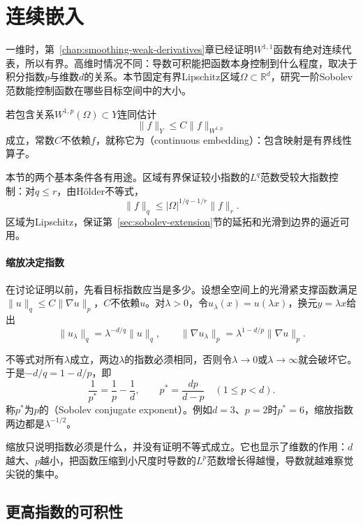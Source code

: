 \section{连续嵌入}
\label{sec:sobolev-continuous-embeddings}

一维时，第~\ref{chap:smoothing-weak-derivatives}章已经证明$W^{1,1}$函数有绝对连续代表，所以有界。高维时情况不同：导数可积能把函数本身控制到什么程度，取决于积分指数$p$与维数$d$的关系。本节固定有界Lipschitz区域$\Omega\subset\mathbb R^d$，研究一阶Sobolev范数能控制函数在哪些目标空间中的大小。

若包含关系$W^{1,p}(\Omega)\subset Y$连同估计
\begin{equation}
\lVert f\rVert_Y\leq C\lVert f\rVert_{W^{1,p}}
\label{eq:sobolev-continuous-embedding}
\end{equation}
成立，常数$C$不依赖$f$，就称它为（continuous embedding）：包含映射是有界线性算子。

本节的两个基本条件各有用途。区域有界保证较小指数的$L^q$范数受较大指数控制：对$q\leq r$，由Hölder不等式，
\[
\lVert f\rVert_q\leq|\Omega|^{1/q-1/r}\lVert f\rVert_r .
\]
区域为Lipschitz，保证第~\ref{sec:sobolev-extension}节的延拓和光滑到边界的逼近可用。

\paragraph{缩放决定指数}
在讨论证明以前，先看目标指数应当是多少。设想全空间上的光滑紧支撑函数满足$\lVert u\rVert_q\leq C\lVert\nabla u\rVert_p$，$C$不依赖$u$。对$\lambda>0$，令$u_\lambda(x)=u(\lambda x)$，换元$y=\lambda x$给出
\[
\lVert u_\lambda\rVert_q=\lambda^{-d/q}\lVert u\rVert_q,\qquad
\lVert\nabla u_\lambda\rVert_p=\lambda^{1-d/p}\lVert\nabla u\rVert_p .
\]

不等式对所有$\lambda$成立，两边$\lambda$的指数必须相同，否则令$\lambda\to0$或$\lambda\to\infty$就会破坏它。于是$-d/q=1-d/p$，即
\begin{equation}
\frac1{p^*}=\frac1p-\frac1d,\qquad p^*=\frac{dp}{d-p}\quad(1\leq p<d).
\label{eq:sobolev-conjugate-exponent}
\end{equation}
称$p^*$为$p$的（Sobolev conjugate exponent）。例如$d=3$、$p=2$时$p^*=6$，缩放指数两边都是$\lambda^{-1/2}$。

缩放只说明指数必须是什么，并没有证明不等式成立。它也显示了维数的作用：$d$越大、$p$越小，把函数压缩到小尺度时导数的$L^p$范数增长得越慢，导数就越难察觉尖锐的集中。

\subsection{更高指数的可积性}
\label{sec:sobolev-higher-integrability}

